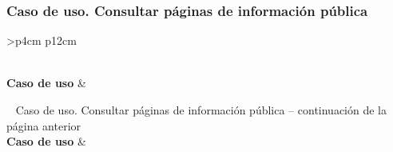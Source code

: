 \subsubsection{Caso de uso. Consultar páginas de información pública} \label{sec:cu_acceso-informacion-publica}
\begin{longtable}{
    >{}p{4cm}
    p{12cm}
    }
    \caption{Caso de uso. Consultar páginas de información pública} \label{table:cu_acceso-informacion-publica} \\
    \toprule
    \textbf{Caso de uso} &  \\
    \endfirsthead
    
    {{ \tablename\ \thetable{} Caso de uso. Consultar páginas de información pública -- continuación de la página anterior}} \\
    \toprule
    \textbf{Caso de uso} &  \\
    \midrule
    \endhead
    
    \midrule
     \\ 
    \endfoot
    
    \bottomrule
    \endlastfoot
    

\end{longtable}
